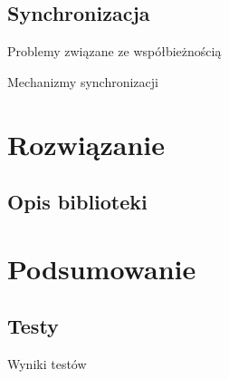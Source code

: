 \documentclass[10pt]{beamer}
\begin{document}
\subsection{Synchronizacja}
\frame
{
\begin{block}{Problemy związane ze współbieżnością}
\end{block}
\begin{block}{Mechanizmy synchronizacji}
\end{block}
}

\section{Rozwiązanie}
\subsection{Opis biblioteki}

\section{Podsumowanie}
\subsection{Testy}
\frame
{
\begin{block}{Wyniki testów}
\end{block}
}

\frame
{

}


\end{document}
